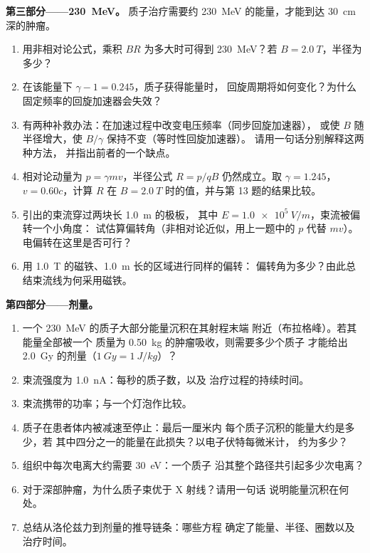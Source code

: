 \begin{problem}
\medskip
\noindent\textbf{第三部分——\qty{230}{MeV}。}
质子治疗需要约 \qty{230}{MeV} 的能量，才能到达
\qty{30}{cm} 深的肿瘤。
\begin{enumerate}[resume]
  \item 用非相对论公式，乘积 $BR$ 为多大时可得到
        \qty{230}{MeV}？若 $B = \qty{2.0}{T}$，半径为多少？
  \item 在该能量下 $\gamma - 1 = 0.245$，质子获得能量时，
        回旋周期将如何变化？为什么
        固定频率的回旋加速器会失效？
  \item 有两种补救办法：在加速过程中改变电压频率（同步回旋加速器），
        或使 $B$ 随半径增大，使 $B/\gamma$ 保持不变（等时性回旋加速器）。
        请用一句话分别解释这两种方法，
        并指出前者的一个缺点。
  \item 相对论动量为 $p = \gamma mv$，半径公式 $R =
        p/qB$ 仍然成立。取 $\gamma = 1.245$，$v = 0.60c$，计算
        $R$ 在 $B = \qty{2.0}{T}$ 时的值，并与第 13 题的结果比较。
  \item 引出的束流穿过两块长 \qty{1.0}{m} 的极板，
        其中 $E = \qty{1.0e5}{V/m}$，束流被偏转一个小角度：
        试估算偏转角（非相对论近似，用上一题中的 $p$
        代替 $mv$）。
        电偏转在这里是否可行？
  \item 用 \qty{1.0}{T} 的磁铁、\qty{1.0}{m} 长的区域进行同样的偏转：
        偏转角为多少？由此总结束流线为何采用磁铁。
\end{enumerate}

\medskip
\noindent\textbf{第四部分——剂量。}
\begin{enumerate}[resume]
  \item 一个 \qty{230}{MeV} 的质子大部分能量沉积在其射程末端
        附近（布拉格峰）。若其能量全部被一个
        质量为 \qty{0.50}{kg} 的肿瘤吸收，则需要多少个质子
        才能给出 \qty{2.0}{Gy} 的剂量（$\qty{1}{Gy} = \qty{1}{J/kg}$）？
  \item 束流强度为 \qty{1.0}{nA}：每秒的质子数，以及
        治疗过程的持续时间。
  \item 束流携带的功率；与一个灯泡作比较。
  \item 质子在患者体内被减速至停止：最后一厘米内
        每个质子沉积的能量大约是多少，若
        其中四分之一的能量在此损失？以电子伏特每微米计，
        约为多少？
  \item 组织中每次电离大约需要 \qty{30}{eV}：一个质子
        沿其整个路径共引起多少次电离？
  \item 对于深部肿瘤，为什么质子束优于 X 射线？请用一句话
        说明能量沉积在何处。
  \item 总结从洛伦兹力到剂量的推导链条：哪些方程
        确定了能量、半径、圈数以及
        治疗时间。
\end{enumerate}
\end{problem}
